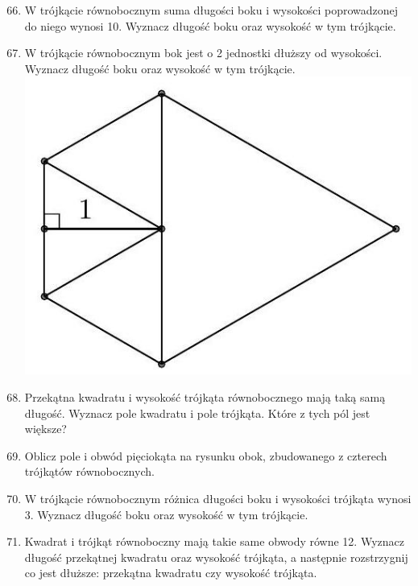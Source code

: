 \documentclass[10pt]{article}
\begin{document}
\begin{enumerate}
  \setcounter{enumi}{65}
  \item W trójkącie równobocznym suma długości boku i wysokości poprowadzonej do niego wynosi 10. Wyznacz długość boku oraz wysokość w tym trójkącie.
  \item W trójkącie równobocznym bok jest o 2 jednostki dłuższy od wysokości. Wyznacz długość boku oraz wysokość w tym trójkącie.\\
\includegraphics[max width=\textwidth, center]{2024_11_21_71f62bd117d375398909g-132}
  \item Przekątna kwadratu i wysokość trójkąta równobocznego mają taką samą długość. Wyznacz pole kwadratu i pole trójkąta. Które z tych pól jest większe?
  \item Oblicz pole i obwód pięciokąta na rysunku obok, zbudowanego z czterech trójkątów równobocznych.
  \item W trójkącie równobocznym różnica długości boku i wysokości trójkąta wynosi 3. Wyznacz długość boku oraz wysokość w tym trójkącie.
  \item Kwadrat i trójkąt równoboczny mają takie same obwody równe 12. Wyznacz długość przekątnej kwadratu oraz wysokość trójkąta, a następnie rozstrzygnij co jest dłuższe: przekątna kwadratu czy wysokość trójkąta.
\end{enumerate}
\end{document}

